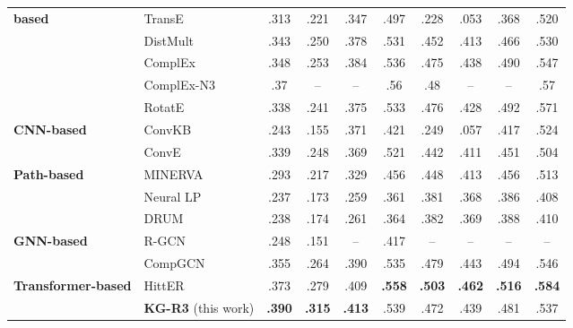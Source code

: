 \begin{table*}[htbp]
\begin{tabular}{llcccc|cccc}
\textbf{based} & TransE \citep{bordes2013translating} & .313 & .221 & .347 & .497 & .228 & .053 & .368 & .520  \\
& DistMult \citep{yang2014embedding} & .343	& .250 & .378 & .531 & .452	& .413 & .466 & .530\\
& ComplEx \citep{trouillon2016complex} & .348 & .253 & .384 & .536 & .475 & .438 & .490 & .547\\
& ComplEx-N3 \citep{Lacroix2018CanonicalTD} & .37 & -- & -- & .56 & .48 & -- & -- & .57 \\
& RotatE \citep{sun2018rotate} & .338 & .241 & .375 & .533 & .476 & .428 & .492 & .571\\ \midrule
\textbf{CNN-based} & ConvKB \citep{nguyen2017novel} & .243 & .155 & .371 & .421 & .249 & .057 & .417 & .524 \\
& ConvE \citep{dettmers2018convolutional} & .339 & .248	& .369 & .521 & .442 & .411 & .451 & .504\\
\midrule
\textbf{Path-based} & MINERVA \citep{das2018go} & .293 & .217 & .329 & .456 & .448 & .413 & .456 & .513\\
& Neural LP \citep{yang2017differentiable} &  .237 & .173 & .259 & .361 & .381 & .368 & .386 & .408\\
& DRUM \citep{sadeghian2019drum} & .238 & .174 & .261 & .364 & .382 & .369 & .388 & .410\\
\midrule
\textbf{GNN-based} & R-GCN \citep{schlichtkrull2018modeling} & .248 & .151 & -- & .417 & -- & -- & -- & -- \\
& CompGCN \citep{vashishth2020compositionbased} & .355 & .264 & .390 & .535 & .479 & .443 & .494 & .546 \\
\midrule
\textbf{Transformer-based} & HittER \citep{chen-etal-2021-hitter} & .373 & .279 & .409 & \textbf{.558} & \textbf{.503} & \textbf{.462} & \textbf{.516} & \textbf{.584} \\
 \midrule
& \textbf{KG-R3} (this work) & \textbf{.390} & \textbf{.315}  & \textbf{.413}  & .539 & .472 & .439 & .481 & .537 \\ \bottomrule
\end{tabular}
\end{table*} 